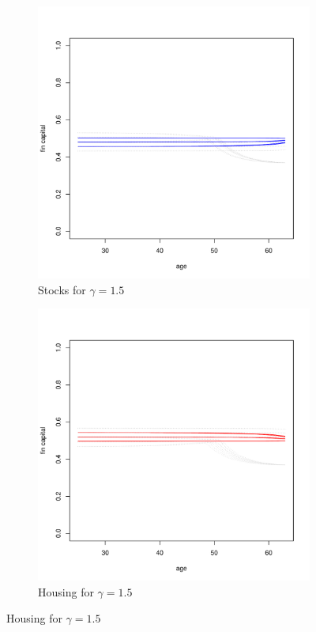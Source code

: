 \begin{figure}[H]
	\centering
    \begin{subfigure}{0.45\textwidth}
		\centering
		\includegraphics[scale=0.3]{figs/smunkhouse15.pdf}
		\caption{Stocks for $\gamma = 1.5$}
	\end{subfigure}
	\hfill
    \begin{subfigure}{0.45\textwidth}
		\centering
		\includegraphics[scale=0.3]{figs/hmunkhouse15.pdf}
		\caption{Housing for $\gamma = 1.5$}
	\end{subfigure}
\end{figure}
